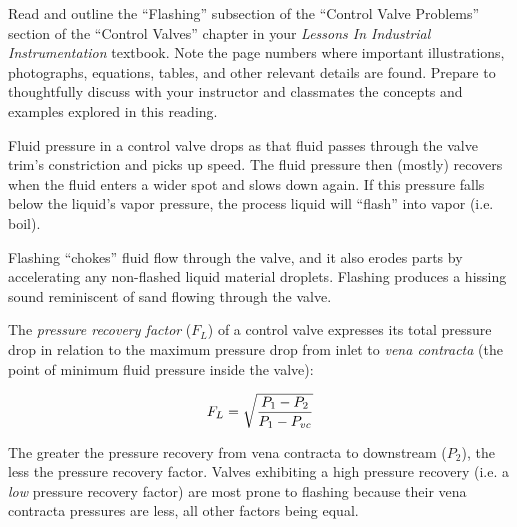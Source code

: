 

Read and outline the ``Flashing'' subsection of the ``Control Valve Problems'' section of the ``Control Valves'' chapter in your {\it Lessons In Industrial Instrumentation} textbook.  Note the page numbers where important illustrations, photographs, equations, tables, and other relevant details are found.  Prepare to thoughtfully discuss with your instructor and classmates the concepts and examples explored in this reading.














Fluid pressure in a control valve drops as that fluid passes through the valve trim's constriction and picks up speed.  The fluid pressure then (mostly) recovers when the fluid enters a wider spot and slows down again.  If this pressure falls below the liquid's vapor pressure, the process liquid will ``flash'' into vapor (i.e. boil).  

\vskip 10pt

Flashing ``chokes'' fluid flow through the valve, and it also erodes parts by accelerating any non-flashed liquid material droplets.  Flashing produces a hissing sound reminiscent of sand flowing through the valve.

\vskip 10pt

The {\it pressure recovery factor} ($F_L$) of a control valve expresses its total pressure drop in relation to the maximum pressure drop from inlet to {\it vena contracta} (the point of minimum fluid pressure inside the valve):

$$F_L = \sqrt{P_1 - P_2 \over P_1 - P_{vc}}$$

The greater the pressure recovery from vena contracta to downstream ($P_2$), the less the pressure recovery factor.  Valves exhibiting a high pressure recovery (i.e. a {\it low} pressure recovery factor) are most prone to flashing because their vena contracta pressures are less, all other factors being equal.

\vskip 10pt

